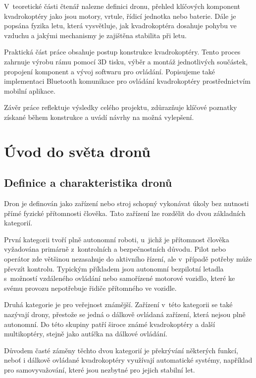 \documentclass[12pt]{report}
\begin{document}
V~teoretické části čtenář nalezne definici dronu, přehled klíčových komponent kvadrokoptéry jako jsou motory, vrtule, řídicí jednotka nebo baterie. Dále je popsána fyzika letu, která vysvětluje, jak kvadrokoptéra dosahuje pohybu ve vzduchu a jakými mechanismy je zajištěna stabilita při letu.

Praktická část práce obsahuje postup konstrukce kvadrokoptéry. Tento proces zahrnuje výrobu rámu pomocí 3D tisku, výběr a montáž jednotlivých součástek, propojení komponent a vývoj softwaru pro ovládání. Popisujeme také implementaci Bluetooth komunikace pro ovládání kvadrokoptéry prostřednictvím mobilní aplikace.

Závěr práce reflektuje výsledky celého projektu, zdůrazňuje klíčové poznatky získané během konstrukce a uvádí návrhy na možná vylepšení.
\part[Úvod do světa dronů]{Úvod do světa dronů}  %

\chapter[Definice a charakteristika dronů]{Definice a charakteristika dronů}

Dron je definován jako zařízení nebo stroj schopný vykonávat úkoly bez nutnosti přímé fyzické přítomnosti člověka. Tato zařízení lze rozdělit do dvou základních kategorií.

První kategorii tvoří plně autonomní roboti, u~jichž je přítomnost člověka vyžadována primárně z~kontrolních a bezpečnostních důvodu. Pilot nebo operátor zde většinou nezasahuje do aktivního řízení, ale v~případě potřeby může převzít kontrolu. Typickým příkladem jsou autonomní bezpilotní letadla s~možností vzdáleného ovládání nebo samořízené motorové vozidlo, které ke svému provozu nepotřebuje řidiče přítomného ve vozidle.

Druhá kategorie je pro veřejnost známější. Zařízení v~této kategorii se také nazývají drony, přestože se jedná o dálkově ovládaná zařízení, která nejsou plně autonomní. Do této skupiny patří široce známé kvadrokoptéry a další multikoptéry, stejně jako autíčka na dálkové ovládání.

Důvodem časté záměny těchto dvou kategorií je překrývání některých funkcí, neboť i dálkově ovládané kvadrokoptéry využívají automatické systémy, například pro samovyvažování, které jsou nezbytné pro jejich stabilní let. \cite{mainbook}
\end{document}
